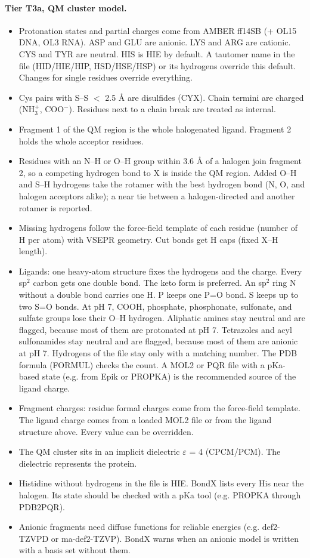 \paragraph{Tier T3a, QM cluster model.}
\begin{itemize}[nosep,leftmargin=*]
\item Protonation states and partial charges come from AMBER ff14SB (+ OL15 DNA, OL3 RNA). ASP and GLU are anionic. LYS and ARG are cationic. CYS and TYR are neutral. HIS is HIE by default. A tautomer name in the file (HID/HIE/HIP, HSD/HSE/HSP) or its hydrogens override this default. Changes for single residues override everything.
\item Cys pairs with S--S $<$ 2.5 \AA{} are disulfides (CYX). Chain termini are charged (NH$_3^+$, COO$^-$). Residues next to a chain break are treated as internal.
\item Fragment 1 of the QM region is the whole halogenated ligand. Fragment 2 holds the whole acceptor residues.
\item Residues with an N--H or O--H group within 3.6 \AA{} of a halogen join fragment 2, so a competing hydrogen bond to X is inside the QM region. Added O--H and S--H hydrogens take the rotamer with the best hydrogen bond (N, O, and halogen acceptors alike); a near tie between a halogen-directed and another rotamer is reported.
\item Missing hydrogens follow the force-field template of each residue (number of H per atom) with VSEPR geometry. Cut bonds get H caps (fixed X--H length).
\item Ligands: one heavy-atom structure fixes the hydrogens and the charge. Every sp$^2$ carbon gets one double bond. The keto form is preferred. An sp$^2$ ring N without a double bond carries one H. P keeps one P=O bond. S keeps up to two S=O bonds. At pH 7, COOH, phosphate, phosphonate, sulfonate, and sulfate groups lose their O--H hydrogen. Aliphatic amines stay neutral and are flagged, because most of them are protonated at pH 7. Tetrazoles and acyl sulfonamides stay neutral and are flagged, because most of them are anionic at pH 7. Hydrogens of the file stay only with a matching number. The PDB formula (FORMUL) checks the count. A MOL2 or PQR file with a pKa-based state (e.g. from Epik or PROPKA) is the recommended source of the ligand charge.
\item Fragment charges: residue formal charges come from the force-field template. The ligand charge comes from a loaded MOL2 file or from the ligand structure above. Every value can be overridden.
\item The QM cluster sits in an implicit dielectric $\varepsilon$ = 4 (CPCM/PCM). The dielectric represents the protein.
\item Histidine without hydrogens in the file is HIE. BondX lists every His near the halogen. Its state should be checked with a pKa tool (e.g. PROPKA through PDB2PQR).
\item Anionic fragments need diffuse functions for reliable energies (e.g. def2-TZVPD or ma-def2-TZVP). BondX warns when an anionic model is written with a basis set without them.
\end{itemize}
